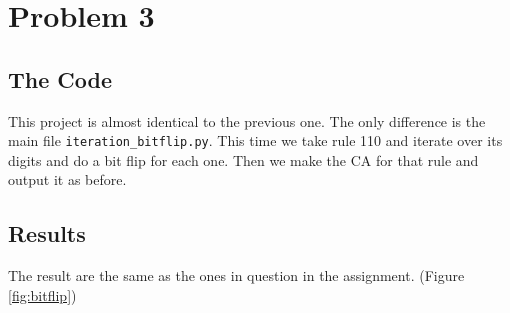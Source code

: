 \documentclass[12pt]{article}
\begin{document}
	\section{Problem 3}
	\subsection{The Code}
	This project is almost identical to the previous one. The only difference is the main file
	\texttt{iteration\_bitflip.py}. This time we take rule 110 and iterate over its digits and do a
	bit flip for each one. Then we make the CA for that rule and output it as before.
	\subsection{Results}
	The result are the same as the ones in question in the assignment. 
	(Figure \ref{fig:bitflip})
	
\end{document}
